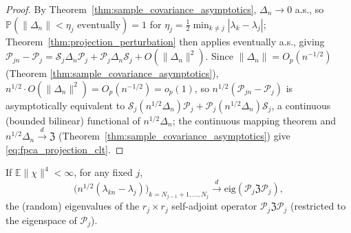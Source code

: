 \begin{proof}
By Theorem~\ref{thm:sample_covariance_asymptotics}, $\Delta_n\to0$ a.s., so
$\mathbb{P}(\|\Delta_n\|<\eta_j\text{ eventually})=1$ for $\eta_j=\frac12
\min_{k\neq j}|\lambda_k-\lambda_j|$; Theorem~\ref{thm:projection_perturbation}
then applies eventually a.s., giving $\mathcal{P}_{jn}-\mathcal{P}_j =
\mathcal{S}_j\Delta_n\mathcal{P}_j+\mathcal{P}_j\Delta_n\mathcal{S}_j +
O(\|\Delta_n\|^2)$. Since $\|\Delta_n\|=O_p(n^{-1/2})$ (Theorem
\ref{thm:sample_covariance_asymptotics}), $n^{1/2}\cdot O(\|\Delta_n\|^2) =
O_p(n^{-1/2}) = o_p(1)$, so $n^{1/2}(\mathcal{P}_{jn}-\mathcal{P}_j)$ is
asymptotically equivalent to $\mathcal{S}_j(n^{1/2}\Delta_n)\mathcal{P}_j+
\mathcal{P}_j(n^{1/2}\Delta_n)\mathcal{S}_j$, a continuous (bounded
bilinear) functional of $n^{1/2}\Delta_n$; the continuous mapping theorem
and $n^{1/2}\Delta_n\xrightarrow{d}\mathfrak{Z}$
(Theorem~\ref{thm:sample_covariance_asymptotics}) give
\eqref{eq:fpca_projection_clt}.
\end{proof}

\begin{theorem}
\label{thm:fpca_eigenvalue_clt}
If $\mathbb{E}\|\chi\|^4<\infty$, for any fixed $j$,
\begin{equation}
\big(n^{1/2}(\lambda_{kn}-\lambda_j)\big)_{k=N_{j-1}+1,\dots,N_j}
\xrightarrow{d} \mathrm{eig}(\mathcal{P}_j\mathfrak{Z}\mathcal{P}_j),
\label{eq:fpca_eigenvalue_clt}
\end{equation}
the (random) eigenvalues of the $r_j\times r_j$ self-adjoint operator
$\mathcal{P}_j\mathfrak{Z}\mathcal{P}_j$ (restricted to the eigenspace of
$\mathcal{P}_j$).
\end{theorem}


